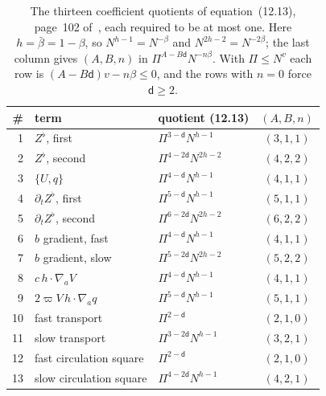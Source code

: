 \documentclass[11pt]{article}
\theoremstyle{remark}
\newcommand{\ev}[1]{\hspace{0.2em}{\small\textsf{[#1]}}}
\begin{document}
\begin{table}[t]
\centering\small
\begin{tabular}{rllc}
\toprule
\# & term & quotient (12.13) & $(A,B,n)$ \\
\midrule
1 & $Z^{\flat}$, first & $\Pi^{3-\mathsf d}N^{h-1}$ & $(3,1,1)$ \\
2 & $Z^{\flat}$, second & $\Pi^{4-2\mathsf d}N^{2h-2}$ & $(4,2,2)$ \\
3 & $\{U,q\}$ & $\Pi^{4-\mathsf d}N^{h-1}$ & $(4,1,1)$ \\
4 & $\partial_{t}Z^{\flat}$, first & $\Pi^{5-\mathsf d}N^{h-1}$ & $(5,1,1)$ \\
5 & $\partial_{t}Z^{\flat}$, second & $\Pi^{6-2\mathsf d}N^{2h-2}$ & $(6,2,2)$ \\
6 & $b$ gradient, fast & $\Pi^{4-\mathsf d}N^{h-1}$ & $(4,1,1)$ \\
7 & $b$ gradient, slow & $\Pi^{5-2\mathsf d}N^{2h-2}$ & $(5,2,2)$ \\
8 & $c\,h\cdot\nabla_{a}V$ & $\Pi^{4-\mathsf d}N^{h-1}$ & $(4,1,1)$ \\
9 & $2\varpi V\,h\cdot\nabla_{a}q$ & $\Pi^{5-\mathsf d}N^{h-1}$ & $(5,1,1)$ \\
10 & fast transport & $\Pi^{2-\mathsf d}$ & $(2,1,0)$ \\
11 & slow transport & $\Pi^{3-2\mathsf d}N^{h-1}$ & $(3,2,1)$ \\
12 & fast circulation square & $\Pi^{2-\mathsf d}$ & $(2,1,0)$ \\
13 & slow circulation square & $\Pi^{4-2\mathsf d}N^{h-1}$ & $(4,2,1)$ \\
\bottomrule
\end{tabular}
\caption{The thirteen coefficient quotients of equation~(12.13), page~102 of~\cite{ab-euler}, each
required to be at most one. Here $h=\bar\beta=1-\beta$, so $N^{h-1}=N^{-\beta}$ and $N^{2h-2}=N^{-2\beta}$;
the last column gives $(A,B,n)$ in $\Pi^{A-B\mathsf d}N^{-n\beta}$. With $\Pi\le N^{v}$ each row is
$(A-B\mathsf d)v-n\beta\le0$, and the rows with $n=0$ force $\mathsf d\ge2$. \ev{V}}\label{tab:euler-quot}
\end{table}
\end{document}
